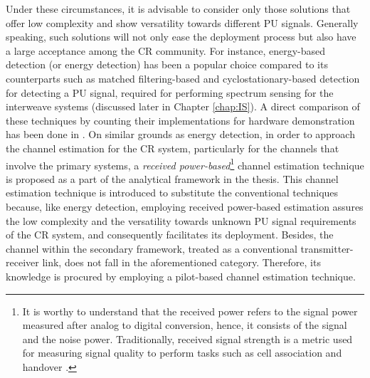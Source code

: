 Under these circumstances, it is advisable to consider only those solutions that offer low complexity and show versatility towards different PU signals. Generally speaking, such solutions will not only ease the deployment process but also have a large acceptance among the CR community. For instance, energy-based detection (or energy detection) has been a popular choice compared to its counterparts such as matched filtering-based and cyclostationary-based detection for detecting a PU signal, required for performing spectrum sensing for the interweave systems (discussed later in Chapter \ref{chap:IS}). A direct comparison of these techniques by counting their implementations for hardware demonstration has been done in \cite{Pawe11}. On similar grounds as energy detection, in order to approach the channel estimation for the CR system, particularly for the channels that involve the primary systems, a \textit{received power-based}\footnote{It is worthy to understand that the received power refers to the signal power measured after analog to digital conversion, hence, it consists of the signal and the noise power. Traditionally, received signal strength is a metric used for measuring signal quality to perform tasks such as cell association and handover \cite{Boga16}.} channel estimation technique is proposed as a part of the analytical framework in the thesis. This channel estimation technique is introduced to substitute the conventional techniques because, like energy detection, employing received power-based estimation assures the low complexity and the versatility towards unknown PU signal requirements of the CR system, and consequently facilitates its deployment. Besides, the channel within the secondary framework, treated as a conventional transmitter-receiver link, does not fall in the aforementioned category. Therefore, its knowledge is procured by employing a pilot-based channel estimation technique.

